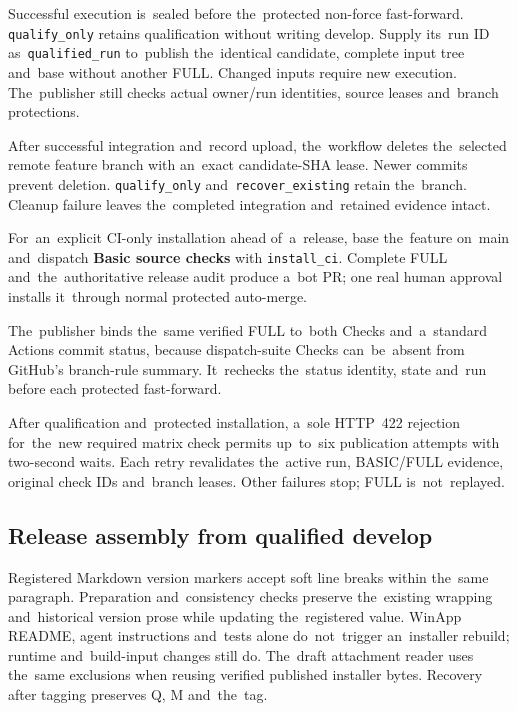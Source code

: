 \documentclass[11pt,a4paper]{article}
\newcommand{\ui}[1]{\textbf{#1}}
\newcommand{\codeword}[1]{\nolinkurl{#1}}
\begin{document}
Successful execution is~sealed before the~protected non-force fast-forward.
\codeword{qualify_only} retains qualification without writing develop.
Supply its~run ID as~\codeword{qualified_run} to~publish the~identical
candidate, complete input tree and~base without another FULL. Changed inputs
require new execution. The~publisher still checks actual owner/run identities,
source leases and~branch protections.

After successful integration and~record upload, the~workflow deletes
the~selected
remote feature branch with an~exact candidate-SHA lease. Newer commits prevent
deletion. \codeword{qualify_only} and~\codeword{recover_existing} retain
the~branch.
Cleanup failure leaves the~completed integration and~retained evidence intact.

For~an~explicit CI-only installation ahead of~a~release, base the~feature
on~main and~dispatch \ui{Basic source checks} with \codeword{install_ci}.
Complete FULL and~the~authoritative release audit produce a~bot PR;
one real human approval installs it~through normal protected auto-merge.

The~publisher binds the~same verified FULL to~both Checks and~a~standard
Actions commit status, because dispatch-suite Checks can~be~absent from
GitHub's branch-rule summary. It~rechecks the~status identity, state and~run
before each protected fast-forward.

After qualification and~protected installation, a~sole HTTP~422 rejection
for~the~new required matrix check permits up~to~six publication attempts with
two-second waits. Each retry revalidates the~active run, BASIC/FULL evidence,
original check IDs and~branch leases. Other failures stop; FULL is~not~replayed.

\subsection{Release assembly from qualified develop}

Registered Markdown version markers accept soft line breaks within the~same
paragraph. Preparation and~consistency checks preserve the~existing wrapping
and~historical version prose while updating the~registered value.
WinApp README, agent instructions and~tests alone do~not~trigger an~installer
rebuild; runtime and~build-input changes still do.
The~draft attachment reader uses the~same exclusions when reusing verified
published installer bytes. Recovery after tagging preserves Q, M and~the~tag.
\end{document}
